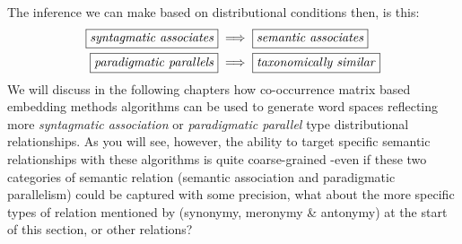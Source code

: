 The inference we can make based on distributional conditions then, is this:
\begin{align}
  \text{\fbox{\emph{syntagmatic associates}}}&\implies\text{\fbox{\emph{\vphantom{g}semantic associates}}}\\
  \text{\fbox{\emph{paradigmatic parallels}}}&\implies\text{\fbox{\emph{taxonomically similar}}}
\end{align}
\noindent
We will discuss in the following chapters how co-occurrence matrix based embedding methods algorithms can be used to generate word spaces reflecting more \emph{syntagmatic association} or \emph{paradigmatic parallel} type distributional relationships. As you will see, however, the ability to target specific semantic relationships with these algorithms is quite coarse-grained -even if these two categories of semantic relation (semantic association and paradigmatic parallelism) could be captured with some precision, what about the more specific types of relation mentioned by \citeauthor{turney10-from-frequen-to-meanin} (synonymy, meronymy \& antonymy) at the start of this section, or other relations?

